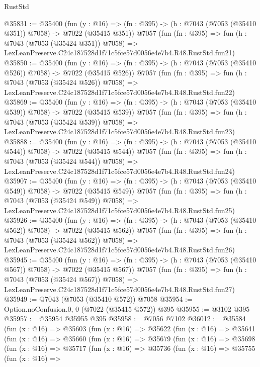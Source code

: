 \begin{lexlean}{RustStd}
\begin{coremodule}
@35831 := @35400
    (fun (y : @16) => (fn : @395) -> (h : @7043 (@7053 (@35410 @351)) @7058) -> @7022 (@35415 @351))
    @7057
    (fun (fn : @395) =>
    fun (h : @7043 (@7053 (@35424 @351)) @7058) =>
    LexLeanPreserve.C24c187528d1f71c5fce57d0056e4e7b4.R48.RustStd.fun21)
@35850 := @35400
    (fun (y : @16) => (fn : @395) -> (h : @7043 (@7053 (@35410 @526)) @7058) -> @7022 (@35415 @526))
    @7057
    (fun (fn : @395) =>
    fun (h : @7043 (@7053 (@35424 @526)) @7058) =>
    LexLeanPreserve.C24c187528d1f71c5fce57d0056e4e7b4.R48.RustStd.fun22)
@35869 := @35400
    (fun (y : @16) => (fn : @395) -> (h : @7043 (@7053 (@35410 @539)) @7058) -> @7022 (@35415 @539))
    @7057
    (fun (fn : @395) =>
    fun (h : @7043 (@7053 (@35424 @539)) @7058) =>
    LexLeanPreserve.C24c187528d1f71c5fce57d0056e4e7b4.R48.RustStd.fun23)
@35888 := @35400
    (fun (y : @16) => (fn : @395) -> (h : @7043 (@7053 (@35410 @544)) @7058) -> @7022 (@35415 @544))
    @7057
    (fun (fn : @395) =>
    fun (h : @7043 (@7053 (@35424 @544)) @7058) =>
    LexLeanPreserve.C24c187528d1f71c5fce57d0056e4e7b4.R48.RustStd.fun24)
@35907 := @35400
    (fun (y : @16) => (fn : @395) -> (h : @7043 (@7053 (@35410 @549)) @7058) -> @7022 (@35415 @549))
    @7057
    (fun (fn : @395) =>
    fun (h : @7043 (@7053 (@35424 @549)) @7058) =>
    LexLeanPreserve.C24c187528d1f71c5fce57d0056e4e7b4.R48.RustStd.fun25)
@35926 := @35400
    (fun (y : @16) => (fn : @395) -> (h : @7043 (@7053 (@35410 @562)) @7058) -> @7022 (@35415 @562))
    @7057
    (fun (fn : @395) =>
    fun (h : @7043 (@7053 (@35424 @562)) @7058) =>
    LexLeanPreserve.C24c187528d1f71c5fce57d0056e4e7b4.R48.RustStd.fun26)
@35945 := @35400
    (fun (y : @16) => (fn : @395) -> (h : @7043 (@7053 (@35410 @567)) @7058) -> @7022 (@35415 @567))
    @7057
    (fun (fn : @395) =>
    fun (h : @7043 (@7053 (@35424 @567)) @7058) =>
    LexLeanPreserve.C24c187528d1f71c5fce57d0056e4e7b4.R48.RustStd.fun27)
@35949 := @7043 (@7053 (@35410 @572)) @7058
@35954 := Option.noConfusion.{0, 0} (@7022 (@35415 @572)) @395
@35955 := @3102 @395
@35957 := @35954 @35955 @395
@35958 := @7056 @7102
@36012 := @35584
    (fun (x : @16) =>
    @35603
      (fun (x : @16) =>
      @35622
        (fun (x : @16) =>
        @35641
          (fun (x : @16) =>
          @35660
            (fun (x : @16) =>
            @35679
              (fun (x : @16) =>
              @35698
                (fun (x : @16) =>
                @35717
                  (fun (x : @16) =>
                  @35736
                    (fun (x : @16) =>
                    @35755
                      (fun (x : @16) =>

\end{coremodule}
\end{lexlean}
